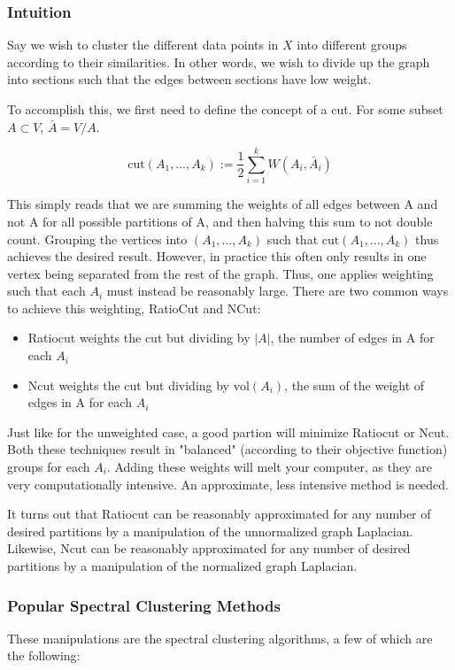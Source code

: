 \documentclass{article}
\begin{document}
\subsubsection{Intuition}

Say we wish to cluster the different data points in $X$ into different groups according to their similarities. In other words, we wish to divide up the graph into sections such that the edges between sections have low weight. 

To accomplish this, we first need to define the concept of a cut. For some subset $A \subset V$, $\bar A = V / A$.

$$\text{cut}(A_1,...,A_k):=\frac{1}{2}\sum_{i=1}^{k}W(A_i,\bar A_i)$$

This simply reads that we are summing the weights of all edges between A and not A for all possible partitions of A, and then halving this sum to not double count. Grouping the vertices into $(A_1,...,A_k)$ such that $\text{cut}(A_1,...,A_k)$ thus achieves the desired result. However, in practice this often only results in one vertex being separated from the rest of the graph. Thus, one applies weighting such that each $A_i$ must instead be reasonably large. There are two common ways to achieve this weighting, RatioCut and NCut:

\begin{itemize}
\item Ratiocut weights the cut but dividing by $\left|A\right|$, the number of edges in A for each $A_i$
\item Ncut weights the cut but dividing by $\text{vol}(A_i)$, the sum of the weight of edges in A for each $A_i$
\end{itemize}

Just like for the unweighted case, a good partion will minimize Ratiocut or Ncut. Both these techniques result in "balanced" (according to their objective function) groups for each $A_i$. Adding these weights will melt your computer, as they are very computationally intensive. An approximate, less intensive method is needed.

It turns out that Ratiocut can be reasonably approximated for any number of desired partitions by a manipulation of the unnormalized graph Laplacian. Likewise, Ncut can be reasonably approximated for any number of desired partitions by a manipulation of the normalized graph Laplacian.

\subsubsection{Popular Spectral Clustering Methods}
These manipulations are the spectral clustering algorithms, a few of which are the following:
\end{document}
